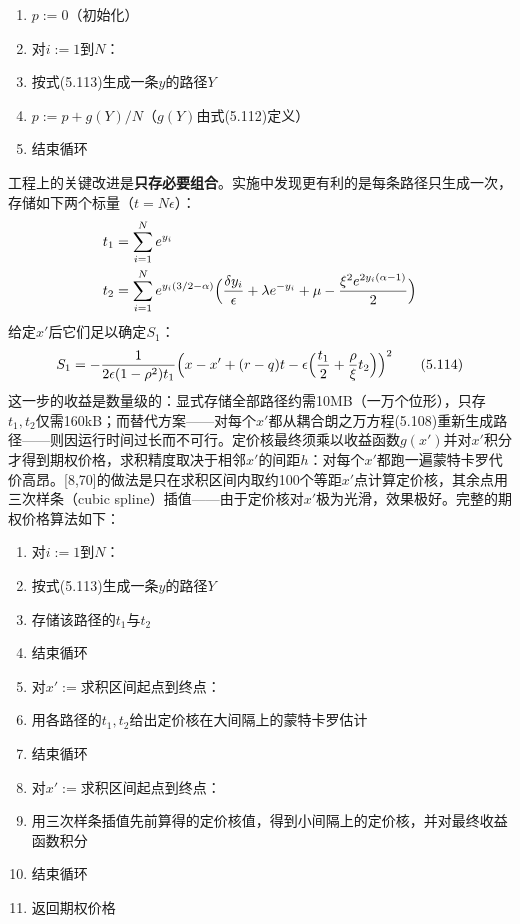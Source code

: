 \begin{enumerate}
\item $p:=0$（初始化）
\item 对$i:=1$到$N$：
\item 按式(5.113)生成一条$y$的路径$Y$
\item $p:=p+g(Y)/N$（$g(Y)$由式(5.112)定义）
\item 结束循环
\end{enumerate}

工程上的关键改进是\textbf{只存必要组合}。实施中发现更有利的是每条路径只生成一次，存储如下两个标量（$t=N\epsilon$）：
\begin{align*}
t_1&=\sum_{i=1}^{N}e^{y_i}\\
t_2&=\sum_{i=1}^{N}e^{y_i(3/2-\alpha)}
\Bigl(\frac{\delta y_i}{\epsilon}+\lambda e^{-y_i}+\mu-\frac{\xi^{2}e^{2y_i(\alpha-1)}}{2}\Bigr)
\end{align*}
给定$x'$后它们足以确定$S_1$：
\begin{equation*}
S_{1}=-\frac{1}{2\epsilon(1-\rho^{2})t_1}
\Bigl(x-x'+(r-q)t-\epsilon\Bigl(\frac{t_1}{2}+\frac{\rho}{\xi}t_2\Bigr)\Bigr)^{2}
\tag{5.114}
\end{equation*}
这一步的收益是数量级的：显式存储全部路径约需10MB（一万个位形），只存$t_1,t_2$仅需160kB；而替代方案——对每个$x'$都从耦合朗之万方程(5.108)重新生成路径——则因运行时间过长而不可行。定价核最终须乘以收益函数$g(x')$并对$x'$积分才得到期权价格，求积精度取决于相邻$x'$的间距$h$：对每个$x'$都跑一遍蒙特卡罗代价高昂。[8,70]的做法是只在求积区间内取约100个等距$x'$点计算定价核，其余点用三次样条（cubic spline）插值——由于定价核对$x'$极为光滑，效果极好。完整的期权价格算法如下：

\begin{enumerate}
\item 对$i:=1$到$N$：
\item 按式(5.113)生成一条$y$的路径$Y$
\item 存储该路径的$t_1$与$t_2$
\item 结束循环
\item 对$x':=$求积区间起点到终点：
\item 用各路径的$t_1,t_2$给出定价核在大间隔上的蒙特卡罗估计
\item 结束循环
\item 对$x':=$求积区间起点到终点：
\item 用三次样条插值先前算得的定价核值，得到小间隔上的定价核，并对最终收益函数积分
\item 结束循环
\item 返回期权价格
\end{enumerate}

